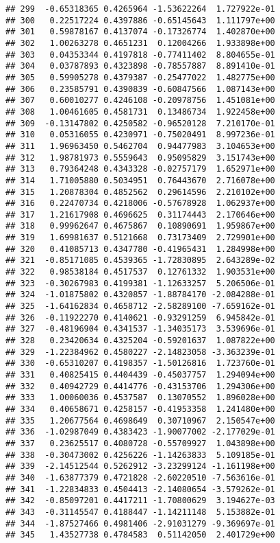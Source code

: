\documentclass[
]{article}
\begin{document}
\begin{verbatim}
## 299  -0.65318365 0.4265964 -1.53622264  1.727922e-01
## 300   0.22517224 0.4397886 -0.65145643  1.111797e+00
## 301   0.59878167 0.4137074 -0.17326774  1.402870e+00
## 302   1.00263278 0.4651231  0.12004266  1.933898e+00
## 303   0.04353344 0.4197818 -0.77411402  8.804655e-01
## 304   0.03787893 0.4323898 -0.78557887  8.891410e-01
## 305   0.59905278 0.4379387 -0.25477022  1.482775e+00
## 306   0.23585791 0.4390839 -0.60847566  1.087143e+00
## 307   0.60010277 0.4246108 -0.20978756  1.451081e+00
## 308   1.00461605 0.4581731  0.13486734  1.922458e+00
## 309  -0.13147802 0.4250582 -0.96520128  7.210170e-01
## 310   0.05316055 0.4230971 -0.75020491  8.997236e-01
## 311   1.96963450 0.5462704  0.94477983  3.104653e+00
## 312   1.98781973 0.5559643  0.95095829  3.151743e+00
## 313   0.79364248 0.4343328 -0.02757179  1.652971e+00
## 314   1.71005880 0.5034951  0.76443670  2.716078e+00
## 315   1.20878304 0.4852562  0.29614596  2.210102e+00
## 316   0.22470734 0.4218006 -0.57678928  1.062937e+00
## 317   1.21617908 0.4696625  0.31174443  2.170646e+00
## 318   0.99962647 0.4675867  0.10890691  1.959867e+00
## 319   1.69981637 0.5121668  0.73173409  2.729901e+00
## 320   0.41085713 0.4347780 -0.41965431  1.284998e+00
## 321  -0.85171085 0.4539365 -1.72830895  2.643289e-02
## 322   0.98538184 0.4517537  0.12761332  1.903531e+00
## 323  -0.30267983 0.4199381 -1.12633257  5.206506e-01
## 324  -1.01875802 0.4320857 -1.88784170 -2.084288e-01
## 325  -1.64162834 0.4658712 -2.58289100 -7.659162e-01
## 326  -0.11922270 0.4140621 -0.93291259  6.945842e-01
## 327  -0.48196904 0.4341537 -1.34035173  3.539696e-01
## 328   0.23420634 0.4325204 -0.59201637  1.087822e+00
## 329  -1.22384962 0.4580227 -2.14823058 -3.363239e-01
## 330  -0.65310207 0.4198357 -1.50126816  1.723760e-01
## 331   0.40825415 0.4404439 -0.45037757  1.294094e+00
## 332   0.40942729 0.4414776 -0.43153706  1.294306e+00
## 333   1.00060036 0.4537587  0.13070552  1.896028e+00
## 334   0.40658671 0.4258157 -0.41953358  1.241480e+00
## 335   1.20677564 0.4698649  0.30710967  2.150547e+00
## 336  -1.02987049 0.4383423 -1.90077002 -2.177029e-01
## 337   0.23625517 0.4080728 -0.55709927  1.043898e+00
## 338  -0.30473002 0.4256226 -1.14263833  5.109185e-01
## 339  -2.14512544 0.5262912 -3.23299124 -1.161198e+00
## 340  -1.63877379 0.4721828 -2.60220510 -7.563616e-01
## 341  -1.22834833 0.4504413 -2.14080654 -3.579262e-01
## 342  -0.85097201 0.4417211 -1.70800629  3.194627e-03
## 343  -0.31145547 0.4188447 -1.14211148  5.153882e-01
## 344  -1.87527466 0.4981406 -2.91031279 -9.369697e-01
## 345   1.43527738 0.4784583  0.51142050  2.401729e+00

\end{verbatim}
\end{document}
